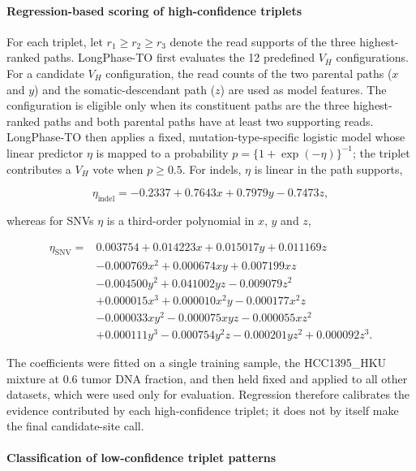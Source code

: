 \documentclass[pdflatex,sn-nature]{sn-jnl}
\begin{document}
\paragraph{Regression-based scoring of high-confidence triplets}\label{rationale-for-pattern-based-evidence-selection}

For each triplet, let \(r_1\geq r_2\geq r_3\) denote the read supports of the three highest-ranked paths. LongPhase-TO first evaluates the 12 predefined \(V_H\) configurations. For a candidate \(V_H\) configuration, the read counts of the two parental paths (\(x\) and \(y\)) and the somatic-descendant path (\(z\)) are used as model features. The configuration is eligible only when its constituent paths are the three highest-ranked paths and both parental paths have at least two supporting reads. LongPhase-TO then applies a fixed, mutation-type-specific logistic model whose linear predictor \(\eta\) is mapped to a probability \(p=\{1+\exp(-\eta)\}^{-1}\); the triplet contributes a \(V_H\) vote when \(p\geq0.5\). For indels, \(\eta\) is linear in the path supports,

\[
\eta_{\mathrm{indel}}=-0.2337+0.7643x+0.7979y-0.7473z,
\]

whereas for SNVs \(\eta\) is a third-order polynomial in \(x\), \(y\) and \(z\),

\[
\begin{aligned}
\eta_{\mathrm{SNV}}={}&0.003754+0.014223x+0.015017y+0.011169z\\
&-0.000769x^2+0.000674xy+0.007199xz\\
&-0.004500y^2+0.041002yz-0.009079z^2\\
&+0.000015x^3+0.000010x^2y-0.000177x^2z\\
&-0.000033xy^2-0.000075xyz-0.000055xz^2\\
&+0.000111y^3-0.000754y^2z-0.000201yz^2+0.000092z^3.
\end{aligned}
\]

The coefficients were fitted on a single training sample, the HCC1395\_HKU mixture at 0.6 tumor DNA fraction, and then held fixed and applied to all other datasets, which were used only for evaluation. Regression therefore calibrates the evidence contributed by each high-confidence triplet; it does not by itself make the final candidate-site call.

\paragraph{Classification of low-confidence triplet patterns}\label{low-confidence-variant-detection-using-vlow-ratio}
\end{document}
